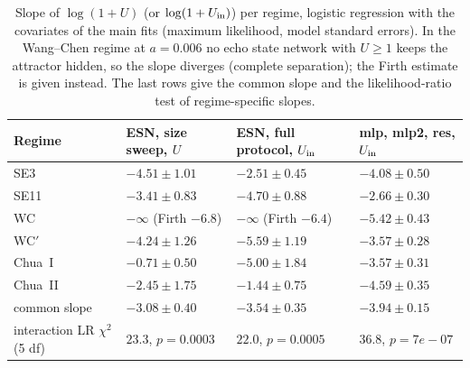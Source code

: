 \begin{table}
\caption{Slope of $\log(1+U)$ (or $\log(1+U_{\mathrm{in}})$) per regime, logistic regression with the covariates of the main fits
(maximum likelihood, model standard errors). In the Wang--Chen regime at $a=0.006$ no echo state network with $U\ge1$
keeps the attractor hidden, so the slope diverges (complete separation); the Firth estimate is given instead. The last rows
give the common slope and the likelihood-ratio test of regime-specific slopes.}
\label{tab:sm_slopes}
\begin{ruledtabular}
\begin{tabular}{llll}
Regime & ESN, size sweep, $U$ & ESN, full protocol, $U_{\mathrm{in}}$ & mlp, mlp2, res, $U_{\mathrm{in}}$ \\
\hline
SE3 & $-4.51\pm1.01$ & $-2.51\pm0.45$ & $-4.08\pm0.50$ \\
SE11 & $-3.41\pm0.83$ & $-4.70\pm0.88$ & $-2.66\pm0.30$ \\
WC & $-\infty$ (Firth $-6.8$) & $-\infty$ (Firth $-6.4$) & $-5.42\pm0.43$ \\
WC$'$ & $-4.24\pm1.26$ & $-5.59\pm1.19$ & $-3.57\pm0.28$ \\
Chua~I & $-0.71\pm0.50$ & $-5.00\pm1.84$ & $-3.57\pm0.31$ \\
Chua~II & $-2.45\pm1.75$ & $-1.44\pm0.75$ & $-4.59\pm0.35$ \\
\hline
common slope & $-3.08\pm0.40$ & $-3.54\pm0.35$ & $-3.94\pm0.15$ \\
interaction LR $\chi^2$ (5 df) & $23.3$, $p=0.0003$ & $22.0$, $p=0.0005$ & $36.8$, $p=7e-07$ \\
\end{tabular}
\end{ruledtabular}
\end{table}
